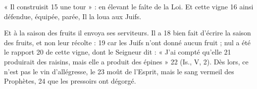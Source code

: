« Il construisit	 
15	 	une tour » : en élevant le faîte de la Loi. Et cette vigne	 
16	 	ainsi défendue, équipée, parée, Il la loua aux Juifs.

Et à la saison des fruits il envoya ses serviteurs. Il a	 
18	 	bien fait d'écrire la saison des fruits, et non leur récolte :	 
19	 	car les Juifs n'ont donné aucun fruit ; nul a été le rapport	 
20	 	de cette vigne, dont le Seigneur dit : « J'ai compté qu'elle	 
21	 	produirait des raisins, mais elle a produit des épines »	 
22	 	(Is., V, 2). Dès lors, ce n'est pas le vin d'allégresse, le	 
23	 	moût de l'Esprit, mais le sang vermeil des Prophètes,	 
24	 	que les pressoirs ont dégorgé.